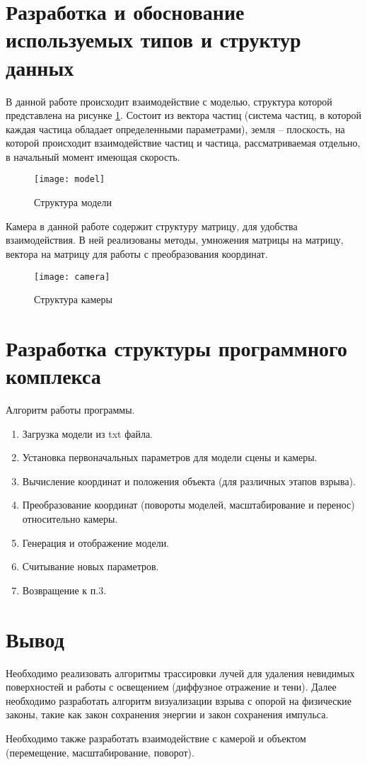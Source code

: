 \section{\textbf{Разработка и обоснование используемых типов и структур данных }}

В данной работе происходит взаимодействие с моделью, структура которой представлена на рисунке \ref{img:model}. Состоит из вектора частиц (система частиц, в которой каждая частица обладает определенными параметрами), земля -- плоскость, на которой происходит взаимодействие частиц и частица, рассматриваемая отдельно, в начальный момент имеющая скорость. 

\begin{figure}[H]
	\centering
	\texttt{[image: model]}
	\caption{Структура модели}
	\label{img:model}
\end{figure}

Камера в данной работе содержит структуру матрицу, для удобства взаимодействия. В ней реализованы методы, умножения матрицы на матрицу, вектора на матрицу для работы с преобразования координат. 

\begin{figure}[H]
	\centering
	\texttt{[image: camera]}
	\caption{Структура камеры}
	\label{img:camera}
\end{figure}

\section{\textbf{Разработка структуры программного комплекса}}
\hfill

Алгоритм работы программы. 
\begin{enumerate}
	\item[1. ] Загрузка модели из txt файла.
	\item[2. ] Установка первоначальных параметров для модели сцены и камеры. 
	\item[3. ] Вычисление координат и положения объекта (для различных этапов взрыва). 
	\item[4. ] Преобразование координат (повороты моделей, масштабирование и перенос) относительно камеры.
	\item[5. ] Генерация и отображение модели. 
	\item[6. ] Считывание новых параметров. 
	\item[7. ] Возвращение к п.3. 
\end{enumerate}

\section{\textbf{Вывод}}

\hfill

Необходимо реализовать алгоритмы трассировки лучей для удаления невидимых поверхностей и работы с освещением (диффузное отражение и тени). Далее необходимо разработать алгоритм визуализации взрыва с опорой на физические законы, такие как закон сохранения энергии и закон сохранения импульса. 

Необходимо также разработать взаимодействие с камерой и объектом (перемещение, масштабирование, поворот). 
